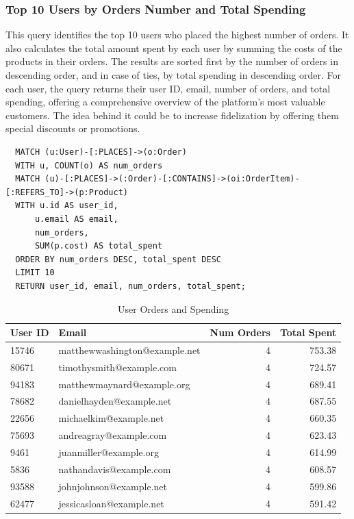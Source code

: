 \documentclass[a4paper,12pt]{article}
\begin{document}
\subsubsection{Top 10 Users by Orders Number and Total Spending}
This query identifies the top 10 users who placed the highest number of orders. It also calculates the total amount spent by each user by summing the costs of the products in their orders. The results are sorted first by the number of orders in descending order, and in case of ties, by total spending in descending order. For each user, the query returns their user ID, email, number of orders, and total spending, offering a comprehensive overview of the platform's most valuable customers.
The idea behind it could be to increase fidelization by offering them special discounts or promotions.
\begin{verbatim}
  MATCH (u:User)-[:PLACES]->(o:Order)
  WITH u, COUNT(o) AS num_orders
  MATCH (u)-[:PLACES]->(:Order)-[:CONTAINS]->(oi:OrderItem)-[:REFERS_TO]->(p:Product)
  WITH u.id AS user_id, 
      u.email AS email, 
      num_orders, 
      SUM(p.cost) AS total_spent
  ORDER BY num_orders DESC, total_spent DESC
  LIMIT 10
  RETURN user_id, email, num_orders, total_spent;
\end{verbatim}
\begin{table}[h!]
  \centering
  \caption{User Orders and Spending}
  \label{tab:user_orders_spending}
  \begin{tabular}{l l r r}
      \toprule
      \textbf{User ID} & \textbf{Email} & \textbf{Num Orders} & \textbf{Total Spent} \\
      \midrule
      15746 & matthewwashington@example.net & 4 & 753.38 \\
      80671 & timothysmith@example.com       & 4 & 724.57 \\
      94183 & matthewmaynard@example.org     & 4 & 689.41 \\
      78682 & danielhayden@example.net       & 4 & 687.55 \\
      22656 & michaelkim@example.net         & 4 & 660.35 \\
      75693 & andreagray@example.com         & 4 & 623.43 \\
      9461  & juanmiller@example.org         & 4 & 614.99 \\
      5836  & nathandavis@example.com        & 4 & 608.57 \\
      93588 & johnjohnson@example.net        & 4 & 599.86 \\
      62477 & jessicasloan@example.net       & 4 & 591.42 \\
      \bottomrule
  \end{tabular}
\end{table}
\end{document}
